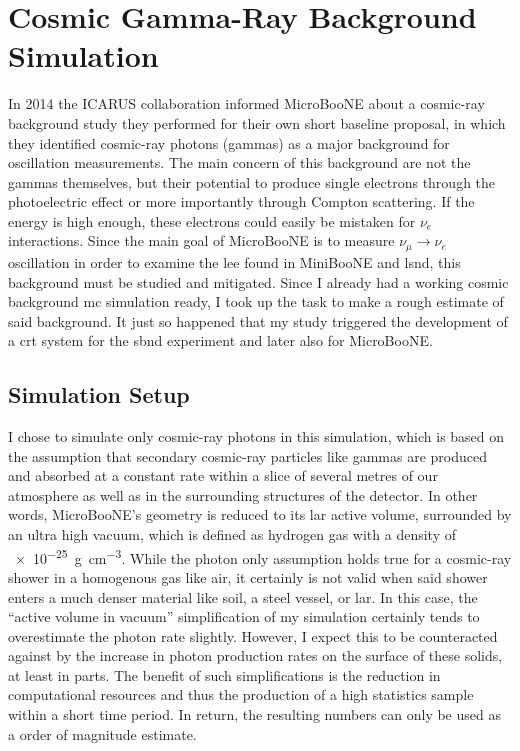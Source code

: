 \chapter{Cosmic Gamma-Ray Background Simulation} \label{sec:CosmicRayGammaBackground}
In 2014 the ICARUS collaboration informed MicroBooNE about a cosmic-ray background study they performed for their own short baseline proposal, in which they identified cosmic-ray photons (gammas) as a major background for oscillation measurements. The main concern of this background are not the gammas themselves, but their potential to produce single electrons through the photoelectric effect or more importantly through Compton scattering. If the energy is high enough, these electrons could easily be mistaken for $\nu_e$ interactions. Since the main goal of MicroBooNE is to measure $\nu_\mu \to \nu_e$ oscillation in order to examine the \gls{lee} found in MiniBooNE and \gls{lsnd}, this background must be studied and mitigated. Since I already had a working cosmic background \gls{mc} simulation ready, I took up the task to make a rough estimate of said background. It just so happened that my study triggered the development of a \gls{crt} system for the \gls{sbnd} experiment and later also for MicroBooNE.

\section{Simulation Setup} \label{sec:SimulationSetup}
I chose to simulate only cosmic-ray photons in this simulation, which is based on the assumption that secondary cosmic-ray particles like gammas are produced and absorbed at a constant rate within a slice of several metres of our atmosphere as well as in the surrounding structures of the detector. In other words, MicroBooNE's geometry is reduced to its \gls{lar} active volume, surrounded by an ultra high vacuum, which is defined as hydrogen gas with a density of \SI{e-25}{\gram\per\centi\metre\cubed}. While the photon only assumption holds true for a cosmic-ray shower in a homogenous gas like air, it certainly is not valid when said shower enters a much denser material like soil, a steel vessel, or \gls{lar}. In this case, the ``active volume in vacuum'' simplification of my simulation certainly tends to overestimate the photon rate slightly. However, I expect this to be counteracted against by the increase in photon production rates on the surface of these solids, at least in parts. The benefit of such simplifications is the reduction in computational resources and thus the production of a high statistics sample within a short time period. In return, the resulting numbers can only be used as a order of magnitude estimate.

